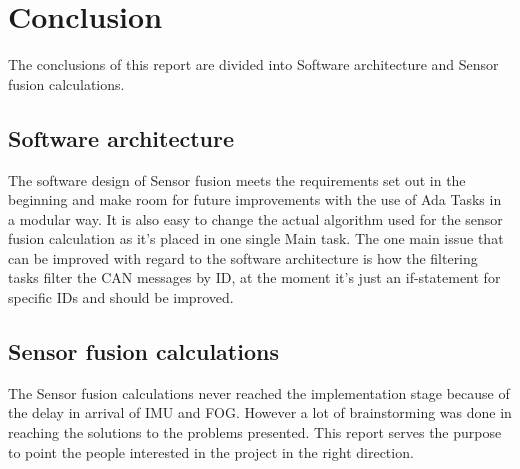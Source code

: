 \section{Conclusion}\label{sec:conclusion}
The conclusions of this report are divided into 
Software architecture and Sensor fusion calculations.

\subsection{Software architecture}
The software design of Sensor fusion meets the requirements set out in the
beginning and make room for future improvements with the use of Ada Tasks
in a modular way. It is also easy to change the actual algorithm used for the
sensor fusion calculation as it's placed in one single Main task. The one main
issue that can be improved with regard to the software architecture is how
the filtering tasks filter the CAN messages by ID, at the moment it's just an
if-statement for specific IDs and should be improved.

\subsection{Sensor fusion calculations}
The Sensor fusion calculations never reached the implementation
stage because of the delay in arrival of IMU and FOG. However a lot
of brainstorming was done in reaching the solutions to the problems presented.
This report serves the purpose to point the people interested in the
project in the right direction.
